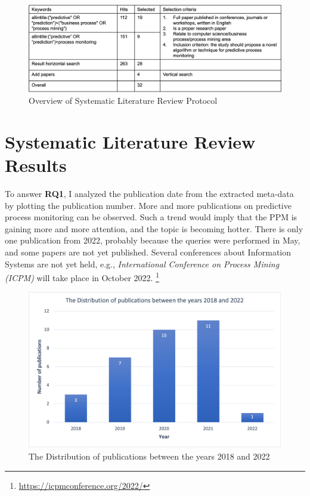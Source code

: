 \documentclass[runningheads]{llncs}
\begin{document}
		\begin{figure}
		\includegraphics[width=\textwidth]{Filtering.png}
		\caption{Overview of Systematic Literature Review Protocol} 
		\label{Filtering}
		\end{figure}
		
		
		
	\section{Systematic Literature Review Results}
		
		To answer \textbf{RQ1}, I analyzed the publication date from the extracted meta-data by plotting the publication number. More and more publications on predictive process monitoring can be observed. Such a trend would imply that the PPM is gaining more and more attention, and the topic is becoming hotter. There is only one publication from 2022, probably because the queries were performed in May, and some papers are not yet published. Several conferences about Information Systems are not yet held, e.g., \textit{International Conference on Process Mining (ICPM)} will take place in October 2022. \footnote{\url{https://icpmconference.org/2022/}} 
		
	
		\begin{figure}
		\includegraphics[scale=0.4]{Distribution_publications.png}
		\centering
		\caption{The Distribution of publications between the years 2018 and 2022}
		\end{figure}
		
\end{document}
